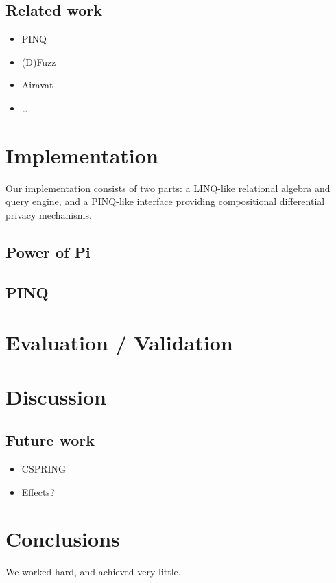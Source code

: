 \documentclass[12pt]{article}
\begin{document}
\subsection{Related work}\label{sec:related_work}

\begin{itemize}
  \item PINQ
  \item (D)Fuzz
  \item Airavat
  \item \ldots
\end{itemize}

\section{Implementation}\label{sec:implementation}

Our implementation consists of two parts: a LINQ-like relational algebra and query engine, and a PINQ-like interface providing compositional differential privacy mechanisms.

\subsection{Power of Pi}\label{sec:power_of_pi}



\subsection{PINQ}\label{sec:pinq}

\section{Evaluation / Validation}\label{sec:evaluation}

\section{Discussion}\label{sec:discussion}

\subsection{Future work}\label{sec:future_work}

\begin{itemize}
  \item CSPRING
  \item Effects?
\end{itemize}

\section{Conclusions}\label{sec:conclusions}
We worked hard, and achieved very little.



\end{document}
